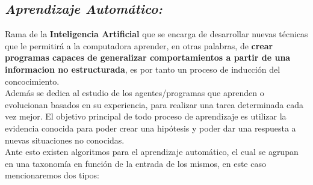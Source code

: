 \documentclass[journal]{IEEEtran}
\begin{document}
\subsection{\textbf{\emph{Aprendizaje Automático:}}}

Rama de la \textbf{Inteligencia Artificial} que se encarga de desarrollar nuevas técnicas que le permitirá a la computadora aprender, en otras palabras, de \textbf{crear programas capaces de generalizar comportamientos a partir de una informacion no estructurada}, es por tanto un proceso de inducción del concocimiento.\\
    
Además se dedica al estudio de los agentes/programas que aprenden o evolucionan basados en su experiencia, para realizar una tarea determinada cada vez mejor. El objetivo principal de todo proceso de aprendizaje es utilizar la evidencia conocida para poder crear una hipótesis y poder dar una respuesta a nuevas situaciones no conocidas.\\
    
Ante esto existen algoritmos para el aprendizaje automático, el cual se agrupan en una taxonomía en función de la entrada de los mismos, en este caso mencionaremos dos tipos:
    
\end{document}
